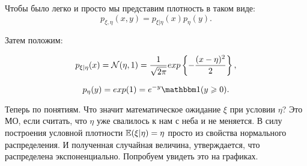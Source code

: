 \documentclass[../TV&MS.tex]{subfiles}
\begin{document}
	Чтобы было легко и просто мы представим плотность в таком виде:
\begin{equation}\label{gathEq}
    p_{\xi,\eta}(x,y) = p_{\xi|\eta}(x) p_{\eta}(y).
\end{equation}

	Затем положим:

\begin{equation}
     p_{\xi|\eta}(x) = \mathcal{N}(\eta, 1) = \frac{1}{\sqrt{2\pi}}
     exp\left\{ -\frac{(x-\eta)^2}{2} \right\},
\end{equation}

\begin{equation}
    p_\eta(y) = exp(1) = e^{-y}\Ind(y \geqslant 0).
\end{equation} 

	Теперь по понятиям. Что значит математическое ожидание $\xi$ при условии $\eta$?
	Это МО, если считать, что $\eta$ уже свалилось к нам с неба и не меняется.
	В силу построения условной плотности $\mathbb{E}(\xi | \eta) = \eta$ просто из 
	свойства нормального распределения. И полученная случайная величина, утверждается, 
	что распределена экспоненциально. Попробуем увидеть это на графиках.
\end{document}
